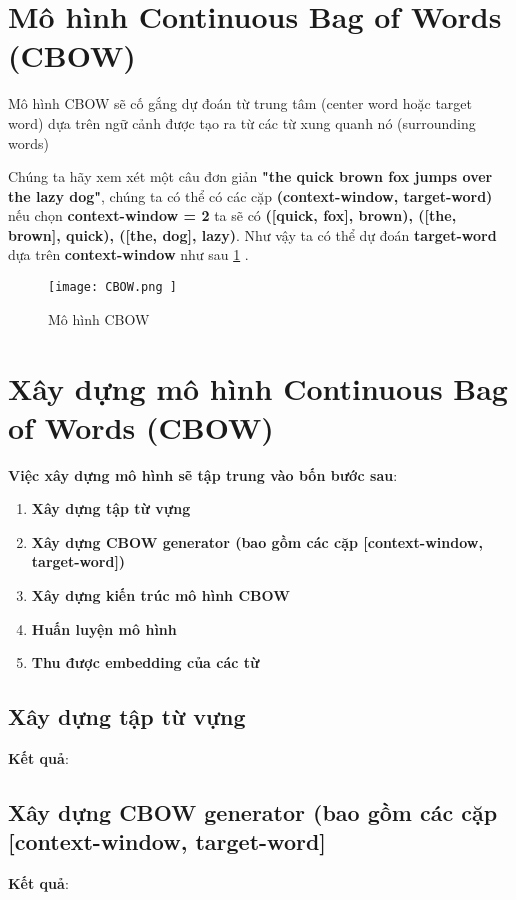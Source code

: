 \section{Mô hình Continuous Bag of Words (CBOW)}

Mô hình CBOW sẽ cố gắng dự đoán từ trung tâm (center word hoặc target word) dựa trên ngữ cảnh được tạo ra từ các từ xung quanh nó (surrounding words)

Chúng ta hãy xem xét một câu đơn giản \textbf{"the quick brown fox jumps over the lazy dog"}, chúng ta có thể có các cặp \textbf{ (context-window, target-word)} nếu chọn \textbf{context-window = 2} ta sẽ có \textbf{ ([quick, fox], brown), ([the, brown], quick), ([the, dog], lazy)}. Như vậy ta có thể dự đoán \textbf{target-word} dựa trên \textbf{context-window} như sau \ref{CBOW} \cite{WEBSITE:19}.


\begin{figure}[h!]
	\centering
	\texttt{[image: 
		CBOW.png
	]}
	\caption[Mô hình CBOW]{
		Mô hình CBOW \label{CBOW}
	}
\end{figure}

\section{Xây dựng mô hình Continuous Bag of Words (CBOW)}

\textbf{ Việc xây dựng mô hình sẽ tập trung vào bốn bước sau}:
\begin{enumerate}
	\item \textbf{Xây dựng tập từ vựng}
	\item \textbf{Xây dựng CBOW generator (bao gồm các cặp [context-window, target-word])}
	\item \textbf{Xây dựng kiến trúc mô hình CBOW}
	\item \textbf{Huấn luyện mô hình}
	\item \textbf{Thu được embedding của các từ}			
\end{enumerate}

\subsection{Xây dựng tập từ vựng}

\textbf{Kết quả}:


\subsection{Xây dựng CBOW generator (bao gồm các cặp [context-window, target-word]}

\textbf{Kết quả}:


